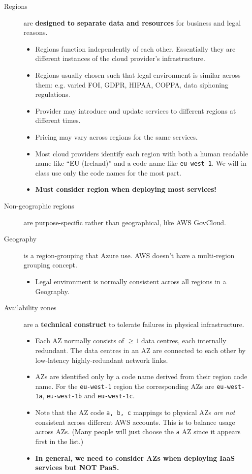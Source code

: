 \documentclass{pgnotes}
\begin{document}
\begin{description}

\item[Regions] are \textbf{designed to separate data and resources} for business and legal reasons.
  
  \begin{itemize}
  \item Regions function independently of each other.  Essentially they are different instances of the cloud provider's infrastructure.
  \item Regions usually chosen such that legal environment is similar across them: e.g. varied FOI, GDPR, HIPAA, COPPA, data siphoning regulations.
  \item Provider may introduce and update services to different regions at different times.
  \item Pricing may vary across regions for the same services.
  \item Most cloud providers identify each region with both a human readable name like ``EU (Ireland)'' and a code name like \texttt{eu-west-1}. We will in class use only the code names for the most part.
  \item \textbf{Must consider region when deploying most services!}
  \end{itemize}

\item[Non-geographic regions] are purpose-specific rather than geographical, like AWS GovCloud.
  
\item[Geography] is a region-grouping that Azure use.  AWS doesn't have a multi-region grouping concept.
  \begin{itemize}
  \item Legal environment is normally consistent across all regions in a Geography.
  \end{itemize}
  
\item[Availability zones] are a \textbf{technical construct} to tolerate failures in physical infrastructure.
  \begin{itemize}
  \item
    Each AZ normally consists of $\ge 1$ data centres, each internally redundant.
    The data centres in an AZ are connected to each other by low-latency highly-redundant network links.
  \item
    AZs are identified only by a code name derived from their region code name.
    For the \texttt{eu-west-1} region the corresponding AZs are \texttt{eu-west-1a}, \texttt{eu-west-1b} and \texttt{eu-west-1c}.
  \item Note that the AZ code \texttt{a, b, c} mappings to physical AZs \textit{are not} consistent across different AWS accounts.
    This is to balance usage across AZs.
    (Many people will just choose the \texttt{a} AZ since it appears first in the list.)
  \item \textbf{In general, we need to consider AZs when deploying IaaS services but NOT PaaS.}
  \end{itemize}  


\end{description}
\end{document}
